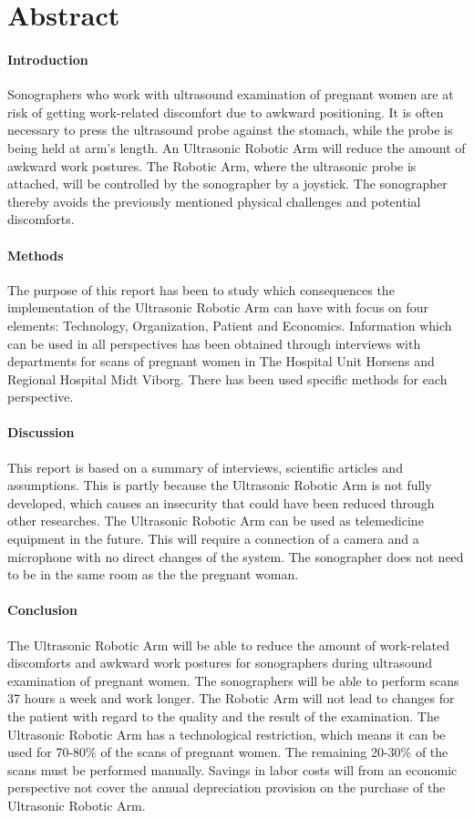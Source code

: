 \chapter{Abstract} 
\subsubsection{Introduction}
Sonographers who work with ultrasound examination of pregnant women are at risk of getting work-related discomfort due to awkward positioning. It is often necessary to press the ultrasound probe against the stomach, while the probe is being held at arm’s length. An Ultrasonic Robotic Arm will reduce the amount of awkward work postures. The Robotic Arm, where the ultrasonic probe is attached, will be controlled by the sonographer by a joystick. The sonographer thereby avoids the previously mentioned physical challenges and potential discomforts. 

\subsubsection{Methods}
The purpose of this report has been to study which consequences the implementation of the Ultrasonic Robotic Arm can have with focus on four elements: Technology, Organization, Patient and Economics. 
Information which can be used in all perspectives has been obtained through interviews with departments for scans of pregnant women in The Hospital Unit Horsens and Regional Hospital Midt Viborg. There has been used specific methods for each perspective.

\subsubsection{Discussion}
This report is based on a summary of interviews, scientific articles and assumptions. This is partly because the Ultrasonic Robotic Arm is not fully developed, which causes an insecurity that could have been reduced through other researches. 
The Ultrasonic Robotic Arm can be used as telemedicine equipment in the future. This will require a connection of a camera and a microphone with no direct changes of the system. The sonographer does not need to be in the same room as the the pregnant woman. 

\subsubsection{Conclusion} 
The Ultrasonic Robotic Arm will be able to reduce the amount of work-related discomforts and awkward work postures for sonographers during ultrasound examination of pregnant women. The sonographers will be able to perform scans 37 hours a week and work longer. The Robotic Arm will not lead to changes for the patient with regard to the quality and the result of the examination. 
The Ultrasonic Robotic Arm has a technological restriction, which means it can be used for 70-80\% of the scans of pregnant women. The remaining 20-30\% of the scans must be performed manually. Savings in labor costs will from an economic perspective not cover the annual depreciation provision on the purchase of the Ultrasonic Robotic Arm.



